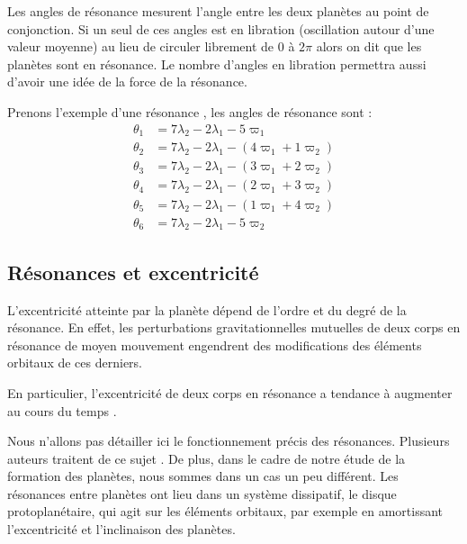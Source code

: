Les angles de résonance mesurent l'angle entre les deux planètes au point de conjonction. Si un seul de ces angles est en
libration (oscillation autour d'une valeur moyenne) au lieu de circuler librement de $0$ à $2\pi$ alors on dit que les planètes
sont en résonance. Le nombre d'angles en libration permettra aussi d'avoir une idée de la force de la résonance.

Prenons l'exemple d'une résonance , les angles de résonance sont :
\begin{align*}
\theta_1 &= 7 \lambda_2 -2\lambda_1 - 5 \varpi_1\\
\theta_2 &= 7 \lambda_2 -2\lambda_1 - \left( 4 \varpi_1 + 1\varpi_2 \right)\\
\theta_3 &= 7 \lambda_2 -2\lambda_1 - \left( 3 \varpi_1 + 2\varpi_2 \right)\\
\theta_4 &= 7 \lambda_2 -2\lambda_1 - \left( 2 \varpi_1 + 3\varpi_2 \right)\\
\theta_5 &= 7 \lambda_2 -2\lambda_1 - \left( 1 \varpi_1 + 4\varpi_2 \right)\\
\theta_6 &= 7 \lambda_2 -2\lambda_1 - 5 \varpi_2
\end{align*}

\bigskip


\subsection{Résonances et excentricité}
L'excentricité atteinte par la planète dépend de l'ordre et du degré de la résonance. En effet, les perturbations gravitationnelles mutuelles de deux corps en
résonance de moyen mouvement engendrent des modifications des éléments orbitaux de ces derniers. 

En particulier, l'excentricité de deux corps en résonance a tendance à augmenter au cours du temps \citep[eq.
(8.29)]{murray2000solar}. 

Nous n'allons pas détailler ici le fonctionnement précis des résonances. Plusieurs auteurs traitent de ce sujet
\citep{greenberg1977orbit, peale1986orbital, malhotra1988phd}. De plus, dans le cadre de notre étude de la formation des
planètes, nous sommes dans un cas un
peu différent. Les résonances entre planètes ont lieu dans un système dissipatif, le disque protoplanétaire, qui agit sur les
éléments orbitaux, par exemple en amortissant l'excentricité et l'inclinaison des planètes.

